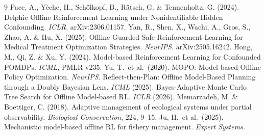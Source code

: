 \documentclass[11pt]{article}
\begin{document}
\begin{thebibliography}{9}
 Pace, A., Yèche, H., Schölkopf, B., Rätsch, G. \& Tennenholtz, G. (2024).
Delphic Offline Reinforcement Learning under Nonidentifiable Hidden Confounding. \emph{ICLR}.
arXiv:2306.01157.
 Yan, R., Shen, X., Wachi, A., Gros, S., Zhao, A. \& Hu, X. (2025).
Offline Guarded Safe Reinforcement Learning for Medical Treatment Optimization Strategies. \emph{NeurIPS}.
arXiv:2505.16242.
 Hong, M., Qi, Z. \& Xu, Y. (2024).
Model-based Reinforcement Learning for Confounded POMDPs. \emph{ICML}, PMLR v235.
 Yu, T.\ et al.\ (2020). MOPO: Model-based Offline Policy Optimization. \emph{NeurIPS}.
 Reflect-then-Plan: Offline Model-Based Planning through a Doubly Bayesian Lens. \emph{ICML} (2025).
 Bayes-Adaptive Monte Carlo Tree Search for Offline Model-based RL. \emph{ICLR} (2026).
 Memarzadeh, M. \& Boettiger, C. (2018). Adaptive management of ecological systems under partial observability. \emph{Biological Conservation}, 224, 9--15.
 Ju, H.\ et al.\ (2025). Mechanistic model-based offline RL for fishery management. \emph{Expert Systems}.
\end{thebibliography}
\end{document}

